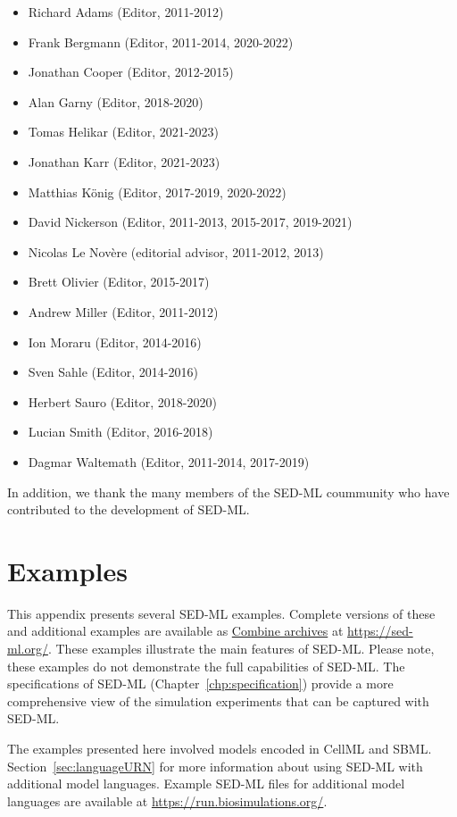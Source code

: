 \documentclass[pdftex,rgb,dvipsnames,svgnames,hyperref,table]{report}
\begin{document}
\begin{itemize}
\item Richard Adams (Editor, 2011-2012)
\item Frank Bergmann (Editor, 2011-2014, 2020-2022)
\item Jonathan Cooper (Editor, 2012-2015)
\item Alan Garny (Editor, 2018-2020)
\item Tomas Helikar (Editor, 2021-2023)
\item Jonathan Karr (Editor, 2021-2023)
\item Matthias K\"{o}nig (Editor, 2017-2019, 2020-2022)
\item David Nickerson (Editor, 2011-2013, 2015-2017, 2019-2021)
\item Nicolas Le Nov{\`e}re (editorial advisor, 2011-2012, 2013)
\item Brett Olivier (Editor, 2015-2017)
\item Andrew Miller (Editor, 2011-2012)
\item Ion Moraru (Editor, 2014-2016)
\item Sven Sahle (Editor, 2014-2016)
\item Herbert Sauro (Editor, 2018-2020)
\item Lucian Smith (Editor, 2016-2018)
\item Dagmar Waltemath (Editor, 2011-2014, 2017-2019)
\end{itemize}

In addition, we thank the many members of the SED-ML coummunity who have contributed to the development of SED-ML.

\appendix

\chapter{Examples}
\label{app:examples}
This appendix presents several SED-ML examples. Complete versions of these and additional examples are available as \hyperref[sec:archive]{Combine archives} at \url{https://sed-ml.org/}. These examples illustrate the main features of SED-ML. Please note, these examples do not demonstrate the full capabilities of SED-ML. The specifications of SED-ML (Chapter~\ref{chp:specification}) provide a more comprehensive view of the simulation experiments that can be captured with SED-ML. 

The examples presented here involved models encoded in CellML and SBML.  Section~\ref{sec:languageURN} for more information about using SED-ML with additional model languages. Example SED-ML files for additional model languages are available at \url{https://run.biosimulations.org/}.
\end{document}
